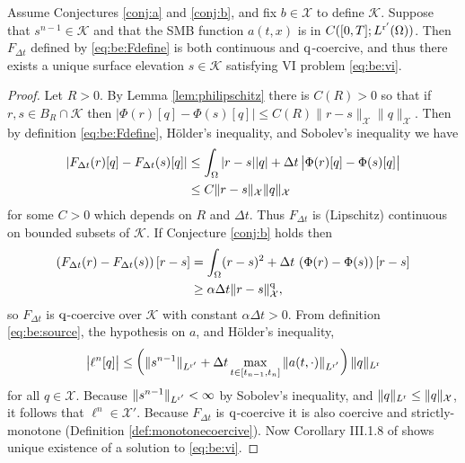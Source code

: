 \documentclass[hidelinks,onefignum,onetabnum,final]{siamart220329}  %
\newcommand{\cK}{\mathcal{K}}
\newcommand{\cX}{\mathcal{X}}
\newcommand{\qq}{{\text{\textnormal{q}}}}
\newcommand{\rr}{{\text{\textnormal{r}}}}
\begin{document}
\begin{theorem} \label{thm:stepwellposed}  Assume Conjectures \ref{conj:a} and \ref{conj:b}, and fix $b \in \cX$ to define $\cK$.  Suppose that $s^{n-1}\in\cK$ and that the SMB function $a(t,x)$ is in $C([0,T]; L^{\rr'}(\Omega))$.  Then $F_{\Delta t}$ defined by \eqref{eq:be:Fdefine} is both continuous and $\qq$-coercive, and thus there exists a unique surface elevation $s\in\cK$ satisfying VI problem \eqref{eq:be:vi}. \end{theorem}

\begin{proof}  Let $R>0$.  By Lemma \ref{lem:philipschitz} there is $C(R)>0$ so that if $r,s\in B_R\cap\cK$ then $\big|\Phi(r)[q] - \Phi(s)[q]\big| \le C(R) \|r-s\|_{\cX} \|q\|_{\cX}$.  Then by definition \eqref{eq:be:Fdefine}, H\"older's inequality, and Sobolev's inequality we have
\begin{align}
\left|F_{\Delta t}(r)[q] - F_{\Delta t}(s)[q]\right| &\le \int_\Omega |r-s||q| + \Delta t\, \big|\Phi(r)[q] - \Phi(s)[q]\big| \\
    &\le C \|r-s\|_{\cX} \|q\|_\cX \notag
\end{align}
for some $C>0$ which depends on $R$ and $\Delta t$.  Thus $F_{\Delta t}$ is (Lipschitz) continuous on bounded subsets of $\cK$.  If Conjecture \ref{conj:b} holds then
\begin{align}
\left(F_{\Delta t}(r) - F_{\Delta t}(s)\right)[r-s] &= \int_\Omega (r-s)^2 + \Delta t\, \left(\Phi(r) - \Phi(s)\right)[r-s] \\
    &\ge \alpha\Delta t \|r-s\|_{\cX}^\qq, \notag
\end{align}
so $F_{\Delta t}$ is $\qq$-coercive over $\cK$ with constant $\alpha\Delta t>0$.  From definition \eqref{eq:be:source}, the hypothesis on $a$, and H\"older's inequality,
\begin{equation}
\big|\ell^n[q]\big| \le \left(\|s^{n-1}\|_{L^{\rr'}} + \Delta t \max_{t\in[t_{n-1},t_n]} \|a(t,\cdot)\|_{L^{\rr'}}\right) \|q\|_{L^\rr}
\label{eq:sourcetermbound}
\end{equation}
for all $q \in \cX$.  Because $\|s^{n-1}\|_{L^{\rr'}}<\infty$ by Sobolev's inequality, and $\|q\|_{L^\rr} \le \|q\|_{\cX}$, it follows that $\ell^n \in \cX'$.  Because $F_{\Delta t}$ is $\qq$-coercive it is also coercive and strictly-monotone (Definition \ref{def:monotonecoercive}).  Now Corollary III.1.8 of \cite{KinderlehrerStampacchia1980} shows unique existence of a solution to \eqref{eq:be:vi}.
\end{proof}
\end{document}
